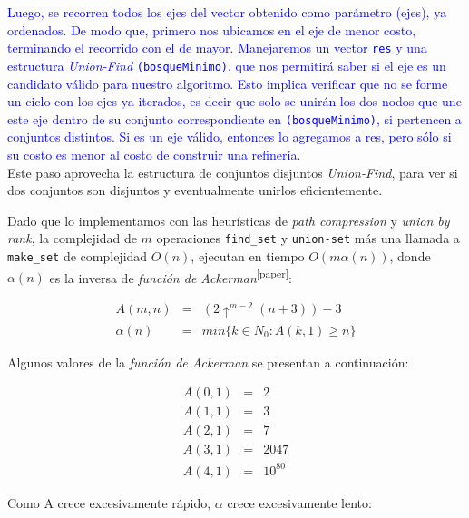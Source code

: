 \textcolor{blue}{Luego, se recorren todos los ejes del vector obtenido como par\'ametro (ejes), ya ordenados. De modo que, primero nos ubicamos en el eje de menor costo, terminando el recorrido con el de mayor. Manejaremos un vector \texttt{res} y una estructura \emph{Union-Find} \texttt{(bosqueMinimo)}, que nos permitir\'a saber si el eje es un candidato v\'alido para nuestro algoritmo. Esto implica verificar que no se forme un ciclo con los ejes ya iterados, es decir que solo se unir\'an los dos nodos que une este eje dentro de su conjunto correspondiente en \texttt{(bosqueMinimo)}, si pertencen a conjuntos distintos. Si es un eje v\'alido, entonces lo agregamos a res, pero s\'olo si su costo es menor al costo de construir una refiner\'ia.}\\

Este paso aprovecha la estructura de conjuntos disjuntos \textit{Union-Find}, para ver si dos conjuntos son disjuntos y eventualmente unirlos eficientemente. 

\newpage

Dado que lo implementamos con las heur\'isticas de \textit{path compression} y \textit{union by rank}, la complejidad de $m$ operaciones \texttt{find_set} y \texttt{union-set} m\'as una llamada a \texttt{make_set} de complejidad $O(n)$, ejecutan en tiempo $O(m\alpha(n))$, donde $\alpha(n)$ es la inversa de\emph{ funci\'on de Ackerman}\textsuperscript{\ref{paper}}:

\begin{equation*}
\begin{array}{lll}
A(m,n) & = & (2\uparrow^{m-2}(n+3))-3 \\
\alpha(n) & = & min\{k \in N_0 : A(k,1) \geq n\}
\end{array}
\end{equation*}

	Algunos valores de la \emph{funci\'on de Ackerman} se presentan a continuaci\'on:

\begin{equation*}
\begin{array}{lll}
A(0,1) & = & 2 \\
A(1,1) & = & 3 \\
A(2,1) & = & 7 \\
A(3,1) & = & 2047 \\
A(4,1) & = & 10^{80}
\end{array}
\end{equation*}

	Como A crece excesivamente r\'apido, $\alpha$ crece excesivamente lento:

